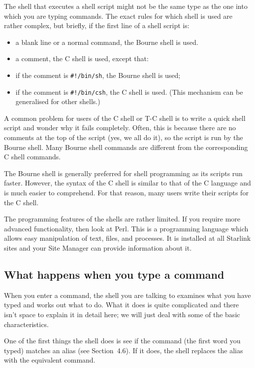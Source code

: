 \documentclass[twoside,11pt]{article}
\newcommand{\htmlref}[2]{#1}
\begin{document}
The shell that executes a shell script might not be the same type as the one
into which you are typing commands.
The exact rules for which shell is used are rather complex, but briefly, if the
first line of a shell script is:
\begin{itemize}
\item a blank line or a normal command, the Bourne shell is used.
\item a comment, the C shell is used, except that:
\item if the comment is {\tt \#!/bin/sh}, the Bourne shell is used;
\item if the comment is {\tt \#!/bin/csh}, the C shell is used.\newline
(This mechanism can be generalised for other shells.)
\end{itemize}
A common problem for users of the C shell or T-C shell is to write a quick
shell script and wonder why it fails completely.
Often, this is because there are no comments at the top of the script (yes,
we all do it), so the script is run by the Bourne shell.
Many Bourne shell commands are different from the corresponding C shell
commands.

The Bourne shell is generally preferred for shell programming as
its scripts run faster. However, the syntax of the C shell
is similar to that of the C language and is much easier to comprehend.
For that reason, many users write their scripts for the C shell.

The programming features of the shells are rather limited. If you require
more advanced functionality, then look at Perl. This is a programming
language which allows easy manipulation of text, files, and processes.
It is installed at all Starlink sites and your Site Manager can provide
information about it.

\subsection{What happens when you type a command}

When you enter a command, the shell you are talking to examines what you have
typed and works out what to do.
What it does is quite complicated and there isn't space to explain it in detail
here; we will just deal with some of the basic characteristics.

One of the first things the shell does is see if the command (the first word
you typed) matches an alias (see \htmlref{Section~4.6}{alias}).
If it does, the shell replaces the alias with the equivalent command.
\end{document}
